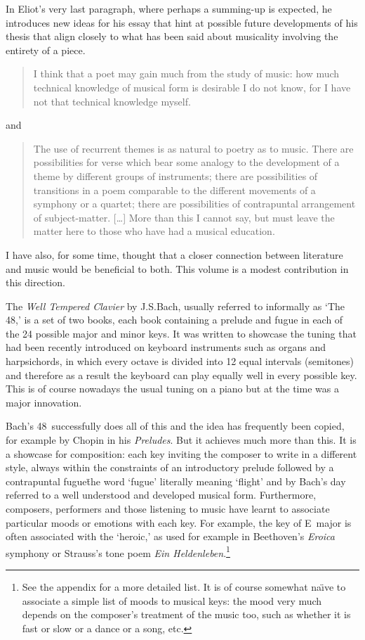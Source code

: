 In Eliot's very last paragraph, where perhaps a summing-up is expected,
he introduces new ideas for his essay that hint at possible future developments of
his thesis that align closely to what has been said about musicality involving
the entirety of a piece. 
\begin{quote}
I think that a poet may gain much from the study of music:
how much technical knowledge of musical form is desirable I do not know, for I have
not that technical knowledge myself.
\end{quote}
and
\begin{quote}
The use of recurrent themes is as natural to poetry as to music.  There are possibilities
for verse which bear some analogy to the development of a theme by different groups of instruments;
there are possibilities of transitions in a poem comparable to the different movements
of a symphony or a quartet; there are possibilities of contrapuntal
arrangement of subject-matter.
[\ldots] More than this I cannot say, but must leave the matter here to those who have had a musical education.
\end{quote}

I have also, for some time, thought that a closer connection between literature and
music would be beneficial to both.  This volume is a modest contribution in this direction.

The \textit{Well Tempered Clavier} by J.S.Bach, usually referred to informally as `The 48,'
is a set of two books, each book containing a prelude and fugue in each of the 24 possible
major and minor keys.  It was written to showcase the tuning that had been recently
introduced on keyboard instruments such as organs and harpsichords, in
which every octave is divided into 12 equal intervals (semitones) and therefore
as a result the keyboard can play equally well in every possible key. This is of course
nowadays the usual tuning on a piano but at the time was a  major innovation.

Bach's 48~successfully does all of this and the idea has frequently
been copied, for example by Chopin in his \textit{Preludes}. But it
achieves much more than this.  It is a showcase for composition: each
key inviting the composer to write in a different style, always within
the constraints of an introductory prelude followed by a contrapuntal
fugue\=the word `fugue' literally meaning `flight' and by Bach's day
referred to a
well understood and developed musical form.  Furthermore, composers,
performers and those listening to music have learnt to associate
particular moods or emotions with each key.  For example, the key of
E\fl\ major is often associated with the `heroic,' as used for example in
Beethoven's \textit{Eroica} symphony or Strauss's tone
poem \textit{Ein Heldenleben}.\footnote{See the appendix for a more
detailed list. It is of course somewhat na\"{\i}ve to associate a simple
list of moods to musical keys: the mood very much depends on the
composer's treatment of the music too, such as whether it is fast or slow or
a dance or a song, etc.}

